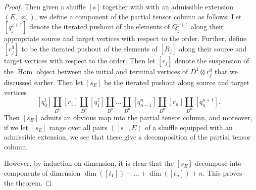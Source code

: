 \documentclass[10pt]{amsart}
\numberwithin{equation}{section}
\theoremstyle{plain}   %
\newtheorem{thm}[subsection]{Theorem}
\theoremstyle{remark}
\theoremstyle{plain}
\begin{document}
\begin{proof}
Then given a shuffle \([s]\) together with with an admissible extension \((E,\ll)\), we define a component of the partial tensor column as follows: Let \([q_j^{j+1}]\) denote the iterated pushout of the elements of \(Q^{j+1}_j\) along their appropriate source and target vertices with respect to the order.  Further, define \([r^0_j]\) to be the iterated pushout of the elements of \([R_j]\) along their source and target vertices with respect to the order. Then let \([r_j]\) denote the suspension of the \(\operatorname{Hom}\) object between the initial and terminal vertices of \(D^1\otimes r^0_j\) that we discussed earlier.  Then let \([s_E]\) be the iterated pushout along source and target vertices \[[q_0^1]\coprod_{D^0} [r_1] \coprod_{D^0} [q_1^2]\coprod_{D^0}\dots \coprod_{D^0} [q^{n}_{n-1}] \coprod_{D^0} [r_n] \coprod_{D^0} [q_n^{n+1}].\]  Then \([s_E]\) admits an obvious map into the partial tensor column, and moreover, if we let \([s_E]\) range over all pairs \(([s],E)\) of a shuffle equipped with an admissible extension, we see that these give a decomposition of the partial tensor column.

However, by induction on dimension, it is clear that the \([s_E]\) decompose into components of dimension \(\operatorname{dim}([t_1]) + \dots + \operatorname{dim}([t_n]) +n\).  This proves the theorem.
\end{proof}

\end{document}
